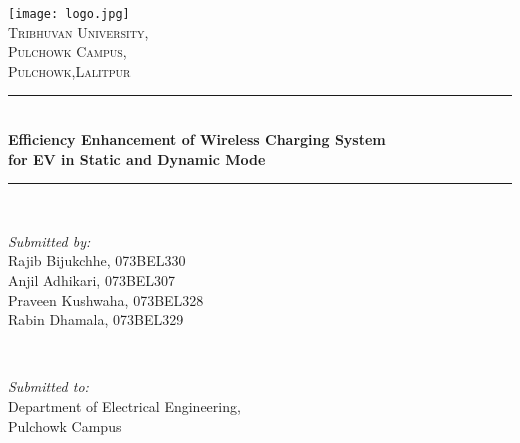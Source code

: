 \begin{titlepage}
	\newcommand{\HRule}{\rule{\linewidth}{1mm}} %
	\center %
	\texttt{[image: logo.jpg]}\\[1cm] %
	\textsc{\LARGE Tribhuvan University, }\\[0.4cm] %
	\textsc{\Large Pulchowk Campus,}\\[0.4cm] %
	\textsc{\large Pulchowk,Lalitpur}\\[0.4cm] %
	\HRule \\[0.4cm]
	{ \large \bfseries Efficiency Enhancement of Wireless Charging System \\[0.3cm] for EV in Static and Dynamic Mode} \\[0.4cm] %
	\HRule \\[1.5cm]


	\begin{minipage}{0.4\textwidth}
		\begin{flushleft} 
			\emph{Submitted by:}\\
			Rajib Bijukchhe, 073BEL330\\
			Anjil Adhikari, 073BEL307\\
			Praveen Kushwaha, 073BEL328\\
			Rabin Dhamala, 073BEL329\\
		\end{flushleft}
	\end{minipage}
	~	
	\begin{minipage}{0.4\textwidth}
		\begin{flushright} 
			\emph{Submitted to:} \\
			Department of Electrical Engineering, \\
			Pulchowk Campus
		\end{flushright}
	\end{minipage}\\[2cm]


\end{titlepage}
